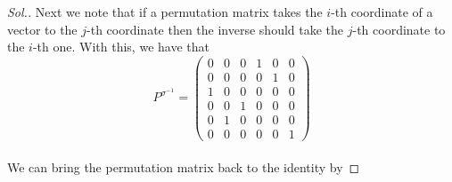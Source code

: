 \documentclass{article}
\begin{document}
\begin{proof}[Sol.]
Next we note that if a permutation matrix takes the $i$-th coordinate of a vector to the $j$-th coordinate then the inverse should take the $j$-th coordinate to the $i$-th one.
With this, we have that 
$$
P^{\sigma^{-1}}=
\begin{pmatrix}
0&0&0&1&0&0\\
0&0&0&0&1&0\\
1&0&0&0&0&0\\
0&0&1&0&0&0\\
0&1&0&0&0&0\\
0&0&0&0&0&1
\end{pmatrix}
$$\\
We can bring the permutation matrix back to the identity by 
\renewcommand{\qedsymbol}{}
\end{proof}
\end{document}
